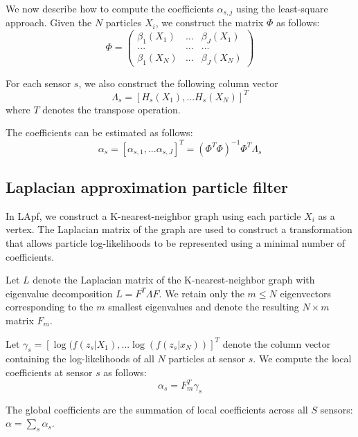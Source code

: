 \documentclass[10pt,letterpaper,final]{article}
\begin{document}
We now describe how to compute the coefficients $\alpha_{s,j}$ using the least-square approach. Given the $N$ particles $X_i$, we construct the matrix $\Phi$ as follows:
\begin{equation}
\Phi=\left(
\begin{array}{ccc}
\beta_1(X_1) & ... & \beta_J(X_1) \\
... & ... & ... \\
\beta_1(X_N) & ... & \beta_J(X_N)
\end{array}
\right)
\label{eqn:beta_matrix}
\end{equation}

For each sensor $s$, we also construct the following column vector
\begin{equation}
\Lambda_s = [ H_s(X_1), ... H_s(X_N)  ]^T
\label{eqn:lambda_vector}
\end{equation}
where $T$ denotes the transpose operation. 

The coefficients can be estimated as follows:
\begin{equation}
\alpha_s = [\alpha_{s,1},...\alpha_{s,J}]^T = (\Phi^T\Phi)^{-1}\Phi^T\Lambda_s
\end{equation}

\subsection{Laplacian approximation particle filter}
In LApf, we construct a K-nearest-neighbor graph using each particle $X_i$ as a vertex. The Laplacian matrix of the graph are used to construct a transformation that allows particle log-likelihoods to be represented using a minimal number of coefficients. 

Let $L$ denote the Laplacian matrix of the K-nearest-neighbor graph with eigenvalue decomposition $L=F^T\Lambda F$. We retain only the $m \leq N$  eigenvectors corresponding to the $m$ smallest eigenvalues and denote the resulting $N\times m$ matrix $F_m$. 

Let $\gamma_s = [\log (f(z_s|X_1), ... \log (f(z_s|x_N))]^T$ denote the column vector containing the log-likelihoods of all $N$ particles at sensor $s$. We compute the local coefficients at sensor $s$ as follows:
\begin{equation}
\alpha_s = F_m^T\gamma_s
\end{equation}

The global coefficients are the summation of local coefficients across all $S$ sensors: $\alpha = \sum_s \alpha_s$. 
\end{document}
